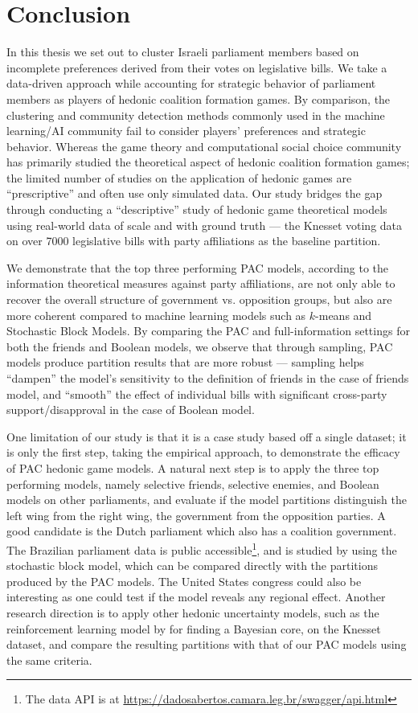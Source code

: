 \chapter{Conclusion}
\label{ch:concl}

In this thesis we set out to cluster Israeli parliament members
based on incomplete preferences derived from their votes on legislative bills.
We take a data-driven approach while accounting for strategic behavior of
parliament members as players of hedonic coalition formation games.
By comparison, the clustering and community detection methods commonly used in
the machine learning/AI community fail to consider players' preferences and
strategic behavior.
Whereas the game theory and computational social choice community has primarily
studied the theoretical aspect of hedonic coalition formation games;
the limited number of studies on the application of hedonic games are
``prescriptive'' and often use only simulated data.
Our study bridges the gap through conducting a ``descriptive'' study of hedonic
game theoretical models using real-world data of scale and with ground truth ---
the Knesset voting data on over 7000 legislative bills with party affiliations as
the baseline partition.

We demonstrate that the top three performing PAC models, according to the
information theoretical measures against party affiliations, are not only able
to recover the overall structure of government vs. opposition groups, but also
are more coherent compared to machine learning models such as $k$-means and
Stochastic Block Models.
By comparing the PAC and full-information settings for both the friends
and Boolean models, we observe that through sampling, PAC models produce
partition results that are more robust --- sampling helps ``dampen'' the
model's sensitivity to the definition of friends in the case of friends model,
and ``smooth'' the effect of individual bills with significant cross-party
support/disapproval in the case of Boolean model.

One limitation of our study is that it is a case study based off a single
dataset; it is only the first step, taking the empirical approach, to
demonstrate the efficacy of PAC hedonic game models.
A natural next step is to apply the three top performing models, namely
selective friends, selective enemies, and Boolean models on other parliaments,
and evaluate if the model partitions distinguish the left wing from the right
wing, the government from the opposition parties.
A good candidate is the Dutch parliament which also has a coalition government. 
The Brazilian parliament data is public accessible\footnote{The data API is at
\url{https://dadosabertos.camara.leg.br/swagger/api.html}}, and is studied by
 using the stochastic block model, which can be compared
directly with the partitions produced by the PAC models.
The United States congress could also be interesting as one could test if the
model reveals any regional effect.
Another research direction is to apply other hedonic uncertainty models, such
as the reinforcement learning model by  for
finding a Bayesian core, on the Knesset dataset, and compare the resulting
partitions with that of our PAC models using the same criteria.